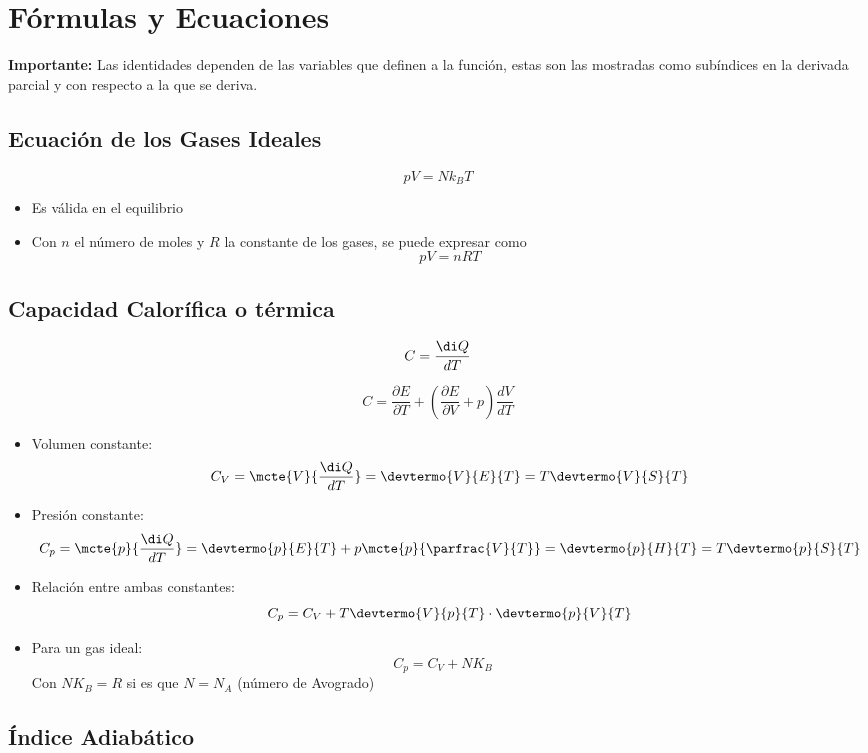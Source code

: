 \section{Fórmulas y Ecuaciones}
\textbf{Importante:} Las identidades dependen de las variables que definen a la función, estas son las mostradas como subíndices en la derivada parcial y con respecto a la que se deriva. 
\subsection{Ecuación de los Gases Ideales}

\[pV=Nk_BT\]
\bigbreak
\begin{itemize}
    \item Es válida en el equilibrio
    \item Con $n$ el número de moles y $R$ la constante de los gases, se puede expresar como
    \[pV=nRT\]
\end{itemize}

\subsection{Capacidad Calorífica o térmica}

\[C=\frac{\di Q}{dT}\]

\[C=\frac{\partial E}{\partial T}+\left(
\frac{\partial E}{\partial V}+p\right)\frac{dV}{dT}\]

\begin{itemize}
    \item Volumen constante:
    \[C_V=\mcte{V}{\frac{\di Q}{d T}}=\devtermo{V}{E}{T} = T\devtermo{V}{S}{T}\]
    \item Presión constante: %
    \[C_p = \mcte{p}{\frac{\di Q}{d T}}=\devtermo{p}{E}{T}+p\mcte{p}{\parfrac{V}{T}} = \devtermo{p}{H}{T} = T\devtermo{p}{S}{T}\]
    \item Relación entre ambas constantes:
    \[C_p = C_V + T\devtermo{V}{p}{T}\cdot \devtermo{p}{V}{T}\]
    \item Para un gas ideal:
    \[C_p = C_V + NK_B \quad\] Con $NK_B = R$ si es que $N = N_A$ (número de Avogrado)
\end{itemize}


\subsection{Índice Adiabático}


